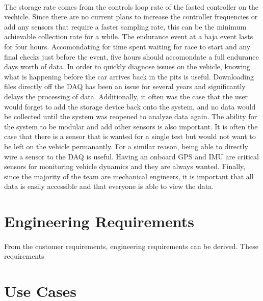 \paragraph{}
The storage rate comes from the controls loop rate of the fasted controller on the vechicle.
Since there are no current plans to increase the controller frequencies or add any sensors that require a faster sampling rate, this can be the minimum achievable collection rate for a while.
The endurance event at a baja event lasts for four hours.
Accomondating for time spent waiting for race to start and any final checks just before the event, five hours should accomondate a full endurance days worth of data.
In order to quickly diagnose issues on the vehicle, knowing what is happening before the car arrives back in the pits is useful.
Downloading files directly off the DAQ has been an issue for several years and significantly delays the processing of data.
Additionally, it often was the case that the user would forget to add the storage device back onto the system, and no data would be collected until the system was reopened to analyze data again.
The ability for the system to be modular and add other sensors is also important.
It is often the case that there is a sensor that is wanted for a single test but would not want to be left on the vehicle permanantly.
For a similar reason, being able to directly wire a sensor to the DAQ is useful.
Having an onboard GPS and IMU are critical sensors for monitoring vehicle dynamics and they are always wanted.
Finally, since the majority of the team are mechanical engineers, it is important that all data is easily accessible and that everyone is able to view the data.

\section{Engineering Requirements}

\paragraph{}
From the customer requirements, engineering requirements can be derived.
These requirements 

\section{Use Cases}